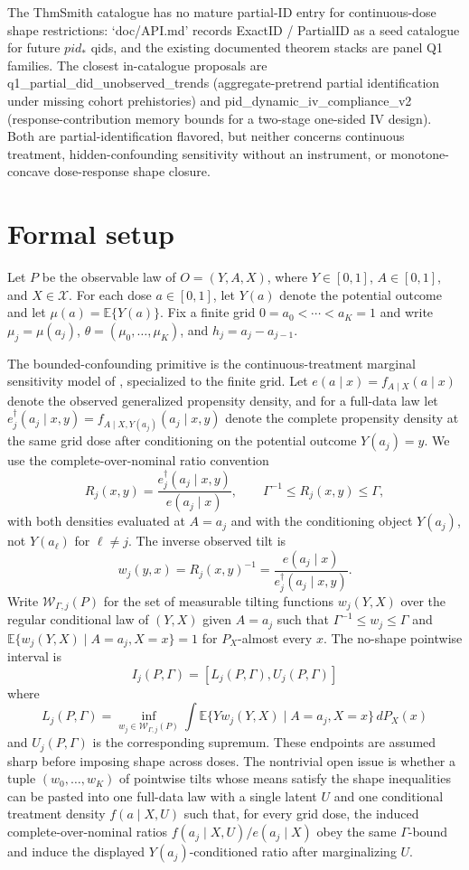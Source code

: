 \documentclass[11pt]{article}
\newcommand{\E}{\mathbb{E}}
\theoremstyle{definition}
\theoremstyle{plain}
\theoremstyle{remark}
\begin{document}
The ThmSmith catalogue has no mature partial-ID entry for continuous-dose shape restrictions: `doc/API.md' records ExactID / PartialID as a seed catalogue for future \(pid_\ast\) qids, and the existing documented theorem stacks are panel Q1 families.  The closest in-catalogue proposals are q1\_partial\_did\_unobserved\_trends (aggregate-pretrend partial identification under missing cohort prehistories) and pid\_dynamic\_iv\_compliance\_v2 (response-contribution memory bounds for a two-stage one-sided IV design).  Both are partial-identification flavored, but neither concerns continuous treatment, hidden-confounding sensitivity without an instrument, or monotone-concave dose-response shape closure.

\section{Formal setup}\label{sec:setup}
Let \(P\) be the observable law of \(O=(Y,A,X)\), where \(Y\in[0,1]\), \(A\in[0,1]\), and \(X\in\mathcal X\).  For each dose \(a\in[0,1]\), let \(Y(a)\) denote the potential outcome and let \(\mu(a)=\E\{Y(a)\}\).  Fix a finite grid \(0=a_0<\cdots<a_K=1\) and write \(\mu_j=\mu(a_j)\), \(\theta=(\mu_0,\ldots,\mu_K)\), and \(h_j=a_j-a_{j-1}\).

The bounded-confounding primitive is the continuous-treatment marginal sensitivity model of \citet{JessonDouglasManshausenSolalMeinshausenStierGalShalit2022}, specialized to the finite grid.  Let \(e(a\mid x)=f_{A\mid X}(a\mid x)\) denote the observed generalized propensity density, and for a full-data law let \(e^\dagger_j(a_j\mid x,y)=f_{A\mid X,Y(a_j)}(a_j\mid x,y)\) denote the complete propensity density at the same grid dose after conditioning on the potential outcome \(Y(a_j)=y\).  We use the complete-over-nominal ratio convention
\[
R_j(x,y)=\frac{e^\dagger_j(a_j\mid x,y)}{e(a_j\mid x)},\qquad
\Gamma^{-1}\le R_j(x,y)\le \Gamma,
\]
with both densities evaluated at \(A=a_j\) and with the conditioning object \(Y(a_j)\), not \(Y(a_\ell)\) for \(\ell\ne j\).  The inverse observed tilt is
\[
w_j(y,x)=R_j(x,y)^{-1}=\frac{e(a_j\mid x)}{e^\dagger_j(a_j\mid x,y)}.
\]
Write \(\mathcal W_{\Gamma,j}(P)\) for the set of measurable tilting functions \(w_j(Y,X)\) over the regular conditional law of \((Y,X)\) given \(A=a_j\) such that \(\Gamma^{-1}\le w_j\le\Gamma\) and \(\E\{w_j(Y,X)\mid A=a_j,X=x\}=1\) for \(P_X\)-almost every \(x\).  The no-shape pointwise interval is
\[
I_j(P,\Gamma)=[L_j(P,\Gamma),U_j(P,\Gamma)]
\]
where
\[
L_j(P,\Gamma)=\inf_{w_j\in\mathcal W_{\Gamma,j}(P)}
\int \E\{Yw_j(Y,X)\mid A=a_j,X=x\}\,dP_X(x)
\]
and \(U_j(P,\Gamma)\) is the corresponding supremum.  These endpoints are assumed sharp before imposing shape across doses.  The nontrivial open issue is whether a tuple \((w_0,\ldots,w_K)\) of pointwise tilts whose means satisfy the shape inequalities can be pasted into one full-data law with a single latent \(U\) and one conditional treatment density \(f(a\mid X,U)\) such that, for every grid dose, the induced complete-over-nominal ratios \(f(a_j\mid X,U)/e(a_j\mid X)\) obey the same \(\Gamma\)-bound and induce the displayed \(Y(a_j)\)-conditioned ratio after marginalizing \(U\).
\end{document}
